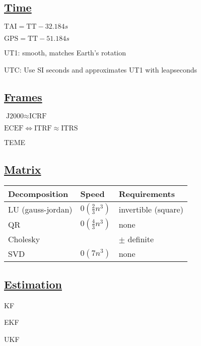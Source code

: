 \documentclass[11pt,landscape]{article}
\begin{document}
\newpage
\subsection{\underline{Time}}

$\text{TAI} = \text{TT} - 32.184s$

$\text{GPS} = \text{TT} - 51.184s$

UT1: smooth, matches Earth's rotation

UTC: Use SI seconds and approximates UT1 with leapseconds


\subsection{\underline{Frames}}

$\text{J2000} \approx \text{ICRF}$

$\text{ECEF} \Leftrightarrow \text{ITRF} \approx \text{ITRS}$

TEME


\subsection{\underline{Matrix}}

\begin{tabular}{ l l l }
Decomposition & Speed & Requirements \\
\hline
LU (gauss-jordan) & $0(\frac{2}{3}n^3)$ & invertible (square) \\ 
QR & $0(\frac{4}{3}n^3)$ & none \\  
Cholesky &  & $\pm$ definite \\
SVD & $0(7n^3)$ & none    
\end{tabular}


\newpage
\subsection{\underline{Estimation}}

KF

EKF

UKF

\scriptsize


\end{document}
